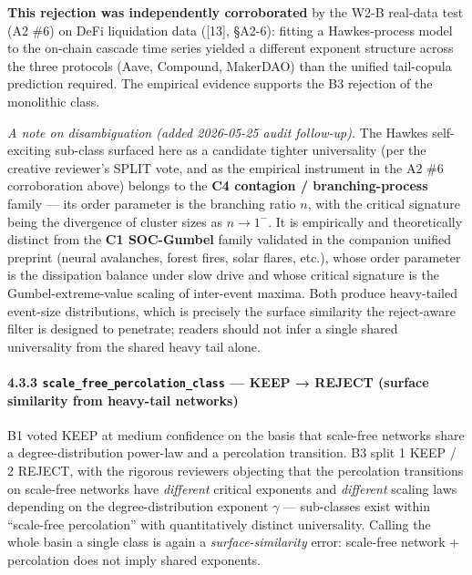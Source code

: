 \documentclass[
  letterpaper,
  11pt]{article}
\begin{document}
\textbf{This rejection was independently corroborated} by the W2-B
real-data test (A2 \#6) on DeFi liquidation data ({[}13{]}, §A2-6):
fitting a Hawkes-process model to the on-chain cascade time series
yielded a different exponent structure across the three protocols (Aave,
Compound, MakerDAO) than the unified tail-copula prediction required.
The empirical evidence supports the B3 rejection of the monolithic
class.

\emph{A note on disambiguation (added 2026-05-25 audit follow-up).} The
Hawkes self-exciting sub-class surfaced here as a candidate tighter
universality (per the creative reviewer's SPLIT vote, and as the
empirical instrument in the A2 \#6 corroboration above) belongs to the
\textbf{C4 contagion / branching-process} family --- its order parameter
is the branching ratio \(n\), with the critical signature being the
divergence of cluster sizes as \(n \to 1^-\). It is empirically and
theoretically distinct from the \textbf{C1 SOC-Gumbel} family validated
in the companion unified preprint (neural avalanches, forest fires,
solar flares, etc.), whose order parameter is the dissipation balance
under slow drive and whose critical signature is the
Gumbel-extreme-value scaling of inter-event maxima. Both produce
heavy-tailed event-size distributions, which is precisely the surface
similarity the reject-aware filter is designed to penetrate; readers
should not infer a single shared universality from the shared heavy tail
alone.

\paragraph{\texorpdfstring{4.3.3
\texttt{scale\_free\_percolation\_class} --- KEEP → REJECT (surface
similarity from heavy-tail
networks)}{4.3.3 scale\_free\_percolation\_class --- KEEP → REJECT (surface similarity from heavy-tail networks)}}\label{scale_free_percolation_class-keep-reject-surface-similarity-from-heavy-tail-networks}

B1 voted KEEP at medium confidence on the basis that scale-free networks
share a degree-distribution power-law and a percolation transition. B3
split 1 KEEP / 2 REJECT, with the rigorous reviewers objecting that the
percolation transitions on scale-free networks have \emph{different}
critical exponents and \emph{different} scaling laws depending on the
degree-distribution exponent \(\gamma\) --- sub-classes exist within
``scale-free percolation'' with quantitatively distinct universality.
Calling the whole basin a single class is again a
\emph{surface-similarity} error: scale-free network + percolation does
not imply shared exponents.
\end{document}
